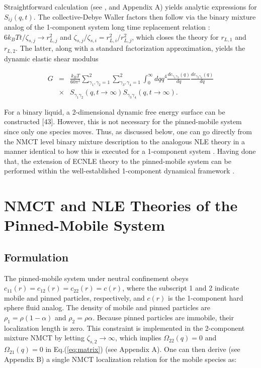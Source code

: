 \documentclass[twocolumn,showpacs,preprintnumbers,amsmath,amssymb,unsortedaddress,
]{revtex4-1}
\begin{document}
Straightforward calculation (see \cite{34}, and Appendix A) yields analytic expressions for $S_{ij}(q,t)$. The collective-Debye Waller factors then follow via the binary mixture analog of the 1-component system long time replacement relation \cite{34}: $6k_BTt/\zeta_{s,j}\rightarrow r_{L,j}^2$ and $\zeta_{s,j}/\zeta_{s,i} = r_{L,i}^2/r_{L,j}^2$, which closes the theory for $r_{L,1}$ and $r_{L,2}$. The latter, along with a standard factorization approximation, yields the dynamic elastic shear modulus \cite{34,41}

\begin{eqnarray}
G &=& \frac{k_BT}{60\pi^2}\sum_{\gamma_1,\gamma_2=1}^{2}\sum_{\gamma_3,\gamma_4=1}^{2}\int_{0}^{\infty}dq q^4\frac{dc_{\gamma_1\gamma_3}(q)}{dq}\frac{dc_{\gamma_2\gamma_4}(q)}{dq}\nonumber\\
&\times&
S_{\gamma_1\gamma_2}(q,t\rightarrow\infty)S_{\gamma_3\gamma_4}(q,t\rightarrow\infty).
\label{eq:shear}
\end{eqnarray}

For a binary liquid, a 2-dimensional dynamic free energy surface can be constructed [43]. However, this is not necessary for the pinned-mobile system since only one species moves. Thus, as discussed below, one can go directly from the NMCT level binary mixture description to the analogous NLE theory in a manner identical to how this is executed for a 1-component system \cite{10,33}. Having done that, the extension of ECNLE theory to the pinned-mobile system can be performed within the well-established 1-component dynamical framework \cite{7}.
\section{NMCT and NLE Theories of the Pinned-Mobile System}
\subsection{Formulation}
The pinned-mobile system under neutral confinement obeys $c_{11}(r)=c_{12}(r)=c_{22}(r)=c(r)$, where the subscript 1 and 2 indicate mobile and pinned particles, respectively, and $c(r)$ is the 1-component hard sphere fluid analog. The density of mobile and pinned particles are $\rho_1=\rho(1-\alpha)$ and $\rho_2=\rho\alpha$. Because pinned particles are immobile, their localization length is zero. This constraint is implemented in the 2-component mixture NMCT by letting $\zeta_{s,2} \rightarrow \infty$, which implies $\Omega_{22}(q) = 0$ and $\Omega_{21}(q) = 0$ in Eq.(\ref{eq:matrix}) (see Appendix A). One can then derive (see Appendix B) a single NMCT localization relation for the mobile species as:
\end{document}
